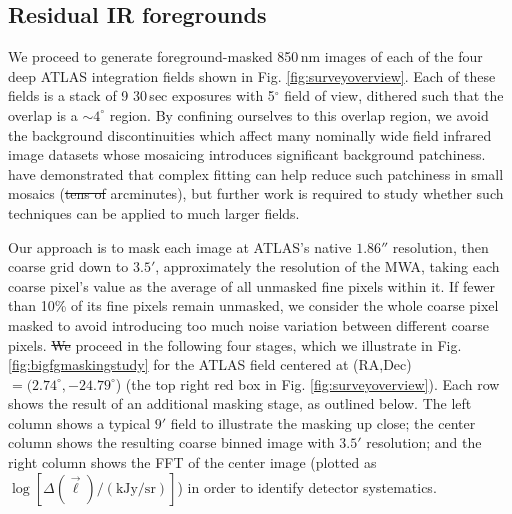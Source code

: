 \documentclass[numberedappendix]{emulateapj}
\providecommand{\DIFadd}[1]{{\protect\color{blue}\uwave{#1}}} %
\providecommand{\DIFdel}[1]{{\protect\color{red}\sout{#1}}}                      %
\providecommand{\DIFaddbegin}{} %
\providecommand{\DIFaddend}{} %
\providecommand{\DIFdelbegin}{} %
\providecommand{\DIFdelend}{} %
\begin{document}
\subsection{Residual IR foregrounds}
\label{sec:resirfg}

We proceed to generate foreground-masked 850\,nm images of each of the four deep ATLAS integration fields shown in Fig. \ref{fig:surveyoverview}. Each of these fields is a stack of 9 30\,sec exposures with 5$^\circ$ field of view, dithered such that the overlap is a $\sim4^\circ$ region. By confining ourselves to this overlap region, we avoid the background discontinuities which affect many nominally wide field infrared image datasets whose mosaicing introduces significant background patchiness. \citet{mw15} have demonstrated that complex fitting \citep{fixen00} can help reduce such patchiness in small mosaics (\DIFdelbegin \DIFdel{tens of }\DIFdelend \DIFaddbegin \DIFadd{$\sim10$ }\DIFaddend arcminutes), but further work is required to study whether such techniques can be applied to much larger fields.

Our approach is to mask each image at ATLAS's native $1.86''$ resolution, then coarse grid down to $3.5'$, approximately the resolution of the MWA, taking each coarse pixel's value as the average of all unmasked fine pixels within it. If fewer than 10\% of its fine pixels remain unmasked, we consider the whole coarse pixel masked to avoid introducing too much noise variation between different coarse pixels. \DIFdelbegin \DIFdel{We }\DIFdelend \DIFaddbegin \DIFadd{For illustrative purposes, we }\DIFaddend proceed in the following four stages, which we illustrate in Fig. \ref{fig:bigfgmaskingstudy} for the ATLAS field centered at (RA,Dec)$=(2.74^\circ, -24.79^\circ$) (the top right red box in Fig. \ref{fig:surveyoverview}). Each row shows the result of an additional masking stage, as outlined below. The left column shows a typical $9'$ field to illustrate the masking up close; the center column shows the resulting coarse binned image with $3.5'$ resolution; and the right column shows the FFT of the center image (plotted as \DIFdelbegin \DIFdel{$\log[\Delta(\vec{\ell})/(\text{kJy/sr})]$}\DIFdelend \DIFaddbegin \DIFadd{$\log[\Delta(\ell)/(\text{kJy/sr})]$}\DIFaddend ) in order to identify detector systematics. 
\end{document}
